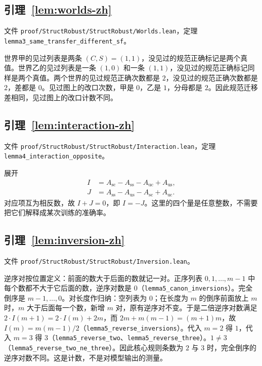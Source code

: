 \documentclass[UTF8,11pt,a4paper]{ctexart}
\theoremstyle{plain}
\begin{document}
\subsection{引理~\ref{lem:worlds-zh}}

文件 \texttt{proof/StructRobust/StructRobust/Worlds.lean}，定理 \texttt{lemma3\_same\_transfer\_different\_sf}。

世界甲的见过列表是两条 $(C,S)=(1,1)$，没见过的规范正确标记是两个真值。世界乙的见过列表是一条 $(1,0)$ 和一条 $(1,1)$，没见过的规范正确标记同样是两个真值。两个世界的见过规范正确次数都是 $2$，没见过的规范正确次数都是 $2$，差都是 $0$。见过图上的改口次数，甲是 $0$，乙是 $1$，分母都是 $2$。因此规范迁移差相同，见过图上的改口计数不同。

\subsection{引理~\ref{lem:interaction-zh}}

文件 \texttt{proof/StructRobust/StructRobust/Interaction.lean}，定理 \texttt{lemma4\_interaction\_opposite}。

展开
\begin{align*}
I&=A_{\mathrm{sc}}-A_{\mathrm{ss}}-A_{\mathrm{uc}}+A_{\mathrm{us}},\\
J&=A_{\mathrm{ss}}-A_{\mathrm{us}}-A_{\mathrm{sc}}+A_{\mathrm{uc}}.
\end{align*}
对应项互为相反数，故 $I+J=0$，即 $I=-J$。这里的四个量是任意整数，不需要把它们解释成某次训练的准确率。

\subsection{引理~\ref{lem:inversion-zh}}

文件 \texttt{proof/StructRobust/StructRobust/Inversion.lean}。

逆序对按位置定义：前面的数大于后面的数就记一对。正序列表 $0,1,\ldots,m-1$ 中每个数都不大于它后面的数，逆序对数是 $0$（\texttt{lemma5\_canon\_inversions}）。完全倒序是 $m-1,\ldots,0$。对长度作归纳：空列表为 $0$；在长度为 $m$ 的倒序前面放上 $m$ 时，$m$ 大于后面每一个数，新增 $m$ 对，原有逆序对不变。于是二倍逆序对数满足 $2\cdot I(m+1)=2\cdot I(m)+2m$，而 $2m+m(m-1)=(m+1)m$，故 $I(m)=m(m-1)/2$（\texttt{lemma5\_reverse\_inversions}）。代入 $m=2$ 得 $1$，代入 $m=3$ 得 $3$（\texttt{lemma5\_reverse\_two}、\texttt{lemma5\_reverse\_three}）。$1\neq 3$（\texttt{lemma5\_reverse\_two\_ne\_three}）。因此核心规则条数为 $2$ 与 $3$ 时，完全倒序的逆序对数不同。这是计数，不是对模型输出的测量。
\end{document}
